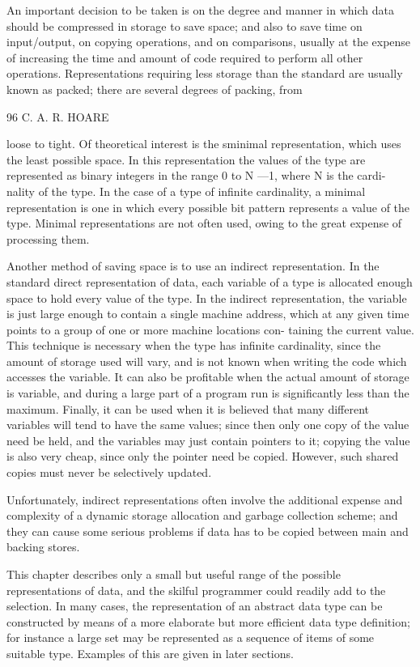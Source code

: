 An important decision to be taken is on the degree and manner in which data should be compressed in storage to save space; and also to save time on input/output, on copying operations, and on comparisons, usually at the expense of increasing the time and amount of code required to perform all other operations. Representations requiring less storage than the standard are usually known as packed; there are several degrees of packing, from

96 C. A. R. HOARE

loose to tight. Of theoretical interest is the sminimal representation, which uses the least possible space. In this representation the values of the type are represented as binary integers in the range 0 to N —1, where N is the cardi- nality of the type. In the case of a type of infinite cardinality, a minimal representation is one in which every possible bit pattern represents a value of the type. Minimal representations are not often used, owing to the great expense of processing them.

Another method of saving space is to use an indirect representation. In the standard direct representation of data, each variable of a type is allocated enough space to hold every value of the type. In the indirect representation, the variable is just large enough to contain a single machine address, which at any given time points to a group of one or more machine locations con- taining the current value. This technique is necessary when the type has infinite cardinality, since the amount of storage used will vary, and is not known when writing the code which accesses the variable. It can also be profitable when the actual amount of storage is variable, and during a large part of a program run is significantly less than the maximum. Finally, it can be used when it is believed that many different variables will tend to have the same values; since then only one copy of the value need be held, and the variables may just contain pointers to it; copying the value is also very cheap, since only the pointer need be copied. However, such shared copies must never be selectively updated.

Unfortunately, indirect representations often involve the additional expense and complexity of a dynamic storage allocation and garbage collection scheme; and they can cause some serious problems if data has to be copied between main and backing stores.

This chapter describes only a small but useful range of the possible representations of data, and the skilful programmer could readily add to the selection. In many cases, the representation of an abstract data type can be constructed by means of a more elaborate but more efficient data type definition; for instance a large set may be represented as a sequence of items of some suitable type. Examples of this are given in later sections.

